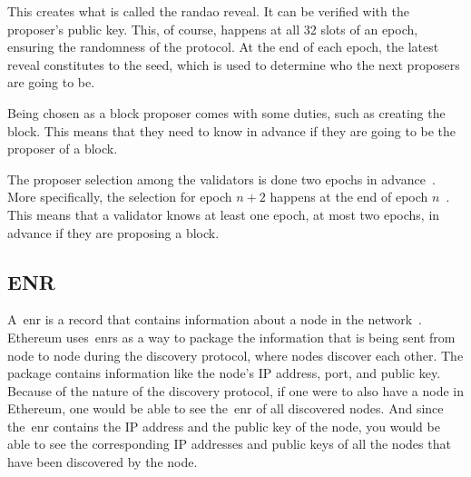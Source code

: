 This creates what is called the \gls{randao} reveal.
It can be verified with the proposer's public key.
This, of course, happens at all 32 slots of an epoch, ensuring the randomness of the protocol.
At the end of each epoch, the latest reveal constitutes to the seed, which is used to determine who the next proposers are going to be.


Being chosen as a block proposer comes with some duties, such as creating the block.
This means that they need to know in advance if they are going to be the proposer of a block.

The proposer selection among the validators is done two epochs in advance~\cite{random-selection}.
More specifically, the selection for epoch $n+2$ happens at the end of epoch $n$~\cite{upgrading-ethereum-randomness}.
This means that a validator knows at least one epoch, at most two epochs, in advance if they are proposing a block.


\subsection{ENR}\label{subsec:enr}
A~\gls{enr} is a record that contains information about a node in the network~\cite{EIP-778:Ethereum-Node-Records}.
Ethereum uses~\glspl{enr} as a way
to package the information that is being sent from node to node during the discovery protocol,
where nodes discover each other.
The package contains information like the node's IP address, port, and public key.
Because of the nature of the discovery protocol, if one were to also have a node in Ethereum,
one would be able to see the~\gls{enr} of all discovered nodes.
And since the~\gls{enr} contains the IP address and the public key of the node,
you would be able
to see the corresponding IP addresses and public keys of all the nodes that have been discovered by the node.


